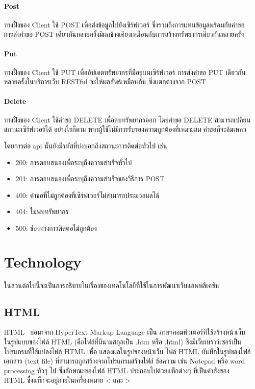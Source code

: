 \paragraph*{Post}
ทางฝั่งของ Client ใช้ POST เพื่อส่งข้อมูลไปยังเซิร์ฟเวอร์ ซึ่งรวมถึงการแทนข้อมูลพร้อมกับคำขอ การส่งคำขอ POST เดียวกันหลายครั้งมีผลข้างเคียงเหมือนกับการสร้างทรัพยากรเดียวกันหลายครั้ง

\paragraph*{Put}
ทางฝั่งของ Client ใช้ PUT เพื่ออัปเดตทรัพยากรที่มีอยู่บนเซิร์ฟเวอร์ การส่งคำขอ PUT เดียวกันหลายครั้งในบริการเว็บ RESTful จะให้ผลลัพธ์เหมือนกัน ซึ่งแตกต่างจาก POST

\paragraph*{Delete}
ทางฝั่งของ Client ใช้คำขอ DELETE เพื่อลบทรัพยากรออก โดยคำขอ DELETE สามารถเปลี่ยนสถานะเซิร์ฟเวอร์ได้ อย่างไรก็ตาม หากผู้ใช้ไม่มีการรับรองความถูกต้องที่เหมาะสม คำขอก็จะล้มเหลว

โดยการต่อ api นั้นยังมีรหัสที่บ่งบอกถึงสถานะการติดต่อทั่วไป เช่น
\begin{itemize}
    \item 200: การตอบสนองเพื่อระบุถึงความสำเร็จทั่วไป
    \item 201: การตอบสนองเพื่อระบุถึงความสำเร็จของวิธีการ POST
    \item 400: คำขอที่ไม่ถูกต้องที่เซิร์ฟเวอร์ไม่สามารถประมวลผลได้
    \item 404: ไม่พบทรัพยากร
    \item 500: ช่องทางการติดต่อไม่ถูกต้อง
\end{itemize}

\section{Technology}
ในส่วนต่อไปนี้จะเป็นการอธิบายในเรื่องของเทคโนโลยีที่ใช้ในการพัฒนาเว็บแอพพลิเคชัน

\subsection{HTML}
HTML~ \cite{HTML} ย่อมาจาก HyperText Markup Language เป็น ภาษาคอมพิวเตอร์ท่ีใช้สร้างหน้าเว็บในรูปแบบของไฟล์ HTML (คือไฟล์ที่มีนามสกุลเป็น .htm หรือ .html) ซึ่งมีเว็บเบราว์เซอร์เป็นโปรแกรมที่ใช้แปลงไฟล์ HTML เพื่อ แสดงผลในรูปของหน้าเว็บ
ไฟล์ HTML บันทึกในรูปของไฟล์เอกสาร (text file) ที่สามารถถูกสร้างจากโปรแกรมสร้างไฟล์ ข้อความ เช่น Notepad หรือ word processing ทั่วๆ ไป ซึ่งลักษณะของไฟล์ HTML ประกอบไปด้วยแท็กต่างๆ ที่เป็นคำสั่งของ HTML ซึ่งแท็กจะอยู่ภายในเครื่องหมาย < และ >

